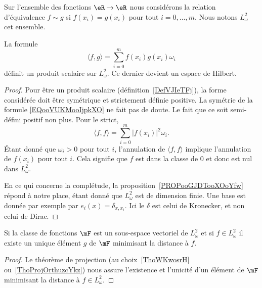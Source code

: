 Sur l'ensemble des fonctions \( \eR\to\eR\) nous considérons la relation d'équivalence \( f\sim g\) si \( f(x_i)=g(x_i)\) pour tout \( i=0,\ldots, m\). Nous notons \(  L^2_{\omega}  \) cet ensemble.

\begin{proposition}
    La formule
    \begin{equation}        \label{EQooVUKMooIjpkXO}
        \langle f, g\rangle =\sum_{i=0}^mf(x_i)g(x_i)\omega_i
    \end{equation}
    définit un produit scalaire sur \( L^2_{\omega}\). Ce dernier devient un espace de Hilbert.
\end{proposition}

\begin{proof}
    Pour être un produit scalaire (définition~\ref{DefVJIeTFj}), la forme considérée doit être symétrique et strictement définie positive. La symétrie de la formule \eqref{EQooVUKMooIjpkXO} ne fait pas de doute. Le fait que ce soit semi-défini positif non plus. Pour le strict,
    \begin{equation}
        \langle f, f\rangle =\sum_{i=0}^m| f(x_i) |^2\omega_i.
    \end{equation}
    Étant donné que \( \omega_i>0\) pour tout \( i\), l'annulation de \( \langle f, f\rangle \) implique l'annulation de \( f(x_i)\) pour tout \( i\). Cela signifie que \( f\) est dans la classe de \( 0\) et donc est nul dans \( L^2_{\omega}\).

    En ce qui concerne la complétude, la proposition~\ref{PROPooGJDTooXOoYfw} répond à notre place, étant donné que \( L^2_{\omega}\) est de dimension finie. Une base est donnée par exemple par \( e_i(x)=\delta_{x,x_{i}}\). Ici le \( \delta\) est celui de Kronecker, et non celui de Dirac.
\end{proof}

\begin{lemma}
    Si la classe de fonctions \( \mF\) est un sous-espace vectoriel de \( L^2_{\omega}\) et si \( f\in L^2_{\omega}\) il existe un unique élément \( g\) de \( \mF\) minimisant la distance à \( f\).
\end{lemma}

\begin{proof}
    Le théorème de projection (au choix~\ref{ThoWKwosrH} ou~\ref{ThoProjOrthuzcYkz}) nous assure l'existence et l'unicité d'un élément de \( \mF\) minimisant la distance à \( f\in L^2_{\omega}\).
\end{proof}

